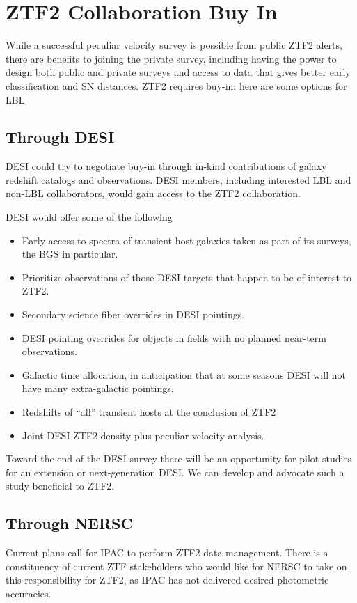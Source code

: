 \section{ZTF2 Collaboration Buy In}

While a successful peculiar velocity survey is possible from public ZTF2 alerts,
there are benefits to joining the private survey, including having the power to design both public and private surveys and
access to data that gives better early classification and SN distances.
ZTF2 requires buy-in: here are some options for LBL

\subsection{Through DESI}

DESI could try to negotiate buy-in through in-kind contributions of galaxy redshift catalogs and observations.  DESI members, including interested
LBL and non-LBL collaborators, would gain access to the ZTF2 collaboration.

DESI would offer some of the following
\begin{itemize}
\item Early access to spectra of transient host-galaxies taken as part of its surveys, the BGS in particular.
\item Prioritize observations of those DESI  targets that happen to be of interest to ZTF2.
\item Secondary science fiber overrides in DESI pointings.
\item DESI pointing overrides for objects in fields with no planned near-term observations.
\item Galactic time allocation, in anticipation that at some seasons DESI will not have many extra-galactic pointings.
\item Redshifts of ``all'' transient hosts at the conclusion of ZTF2
\item Joint DESI-ZTF2 density plus peculiar-velocity analysis.
\end{itemize}

Toward the end of the DESI survey there will be an opportunity for pilot studies for an extension or next-generation DESI.  
We can develop and advocate such a study beneficial to ZTF2.

\subsection{Through NERSC}
Current plans call for IPAC to perform ZTF2 data management. There is a constituency of current ZTF stakeholders who
would like for NERSC to take on this responsibility for ZTF2, as IPAC has not delivered desired photometric accuracies.


